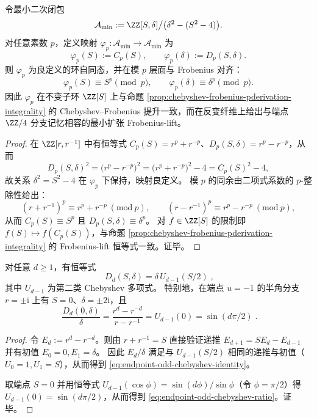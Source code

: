 \begin{proposition}\label{prop:endpoint-antiinv-frobenius-lift}
令最小二次闭包
\[
\mathcal{A}_{\min}:=\ZZ[S,\delta]\big/\bigl(\delta^2-(S^2-4)\bigr).
\]
对任意素数 \(p\)，定义映射 \(\varphi_p:\mathcal{A}_{\min}\to\mathcal{A}_{\min}\) 为
\[
\varphi_p(S):=C_p(S),
\qquad
\varphi_p(\delta):=D_p(S,\delta).
\]
则 \(\varphi_p\) 为良定义的环自同态，并在模 \(p\) 层面与 Frobenius 对齐：
\[
\varphi_p(S)\equiv S^p\pmod p,
\qquad
\varphi_p(\delta)\equiv \delta^p\pmod p.
\]
因此 \(\varphi_p\) 在不变子环 \(\ZZ[S]\) 上与命题 \ref{prop:chebyshev-frobenius-pderivation-integrality} 的 Chebyshev--Frobenius 提升一致，而在反变纤维上给出与端点 \(\ZZ/4\) 分支记忆相容的最小扩张 Frobenius-lift。
\end{proposition}
\begin{proof}
在 \(\ZZ[r,r^{-1}]\) 中有恒等式 \(C_p(S)=r^p+r^{-p}\)、\(D_p(S,\delta)=r^p-r^{-p}\)，从而
\[
D_p(S,\delta)^2
=\bigl(r^p-r^{-p}\bigr)^2
=\bigl(r^p+r^{-p}\bigr)^2-4
=C_p(S)^2-4,
\]
故关系 \(\delta^2=S^2-4\) 在 \(\varphi_p\) 下保持，映射良定义。
模 \(p\) 的同余由二项式系数的 \(p\)-整除性给出：
\[
(r+r^{-1})^p\equiv r^p+r^{-p}\ (\mathrm{mod}\ p),
\qquad
(r-r^{-1})^p\equiv r^p-r^{-p}\ (\mathrm{mod}\ p),
\]
从而 \(C_p(S)\equiv S^p\) 且 \(D_p(S,\delta)\equiv \delta^p\)。
对 \(f\in\ZZ[S]\) 的限制即 \(f(S)\mapsto f(C_p(S))\)，与命题 \ref{prop:chebyshev-frobenius-pderivation-integrality} 的 Frobenius-lift 恒等式一致。证毕。
\end{proof}

\begin{proposition}\label{prop:endpoint-odd-chebyshev-identity}
对任意 \(d\ge 1\)，有恒等式
\begin{equation}\label{eq:endpoint-odd-chebyshev-identity}
\boxed{\;
D_d(S,\delta)=\delta\,U_{d-1}(S/2)\; },
\end{equation}
其中 \(U_{d-1}\) 为第二类 Chebyshev 多项式。
特别地，在端点 \(u=-1\) 的半角分支 \(r=\pm\mathrm{i}\) 上有 \(S=0\)、\(\delta=\pm 2\mathrm{i}\)，且
\begin{equation}\label{eq:endpoint-odd-chebyshev-ratio}
\boxed{\;
\frac{D_d(0,\delta)}{\delta}
=\frac{r^{d}-r^{-d}}{r-r^{-1}}
=U_{d-1}(0)
=\sin(d\pi/2)\; }.
\end{equation}
\end{proposition}
\begin{proof}
令 \(E_d:=r^{d}-r^{-d}\)。则由 \(r+r^{-1}=S\) 直接验证递推
\(
E_{d+1}=SE_d-E_{d-1}
\)
并有初值 \(E_0=0,E_1=\delta\)。
因此 \(E_d/\delta\) 满足与 \(U_{d-1}(S/2)\) 相同的递推与初值（\(U_0=1,U_1=S\)），从而得到 \eqref{eq:endpoint-odd-chebyshev-identity}。
\par
取端点 \(S=0\) 并用恒等式 \(U_{d-1}(\cos\phi)=\sin(d\phi)/\sin\phi\)（令 \(\phi=\pi/2\)）得 \(U_{d-1}(0)=\sin(d\pi/2)\)，从而得到 \eqref{eq:endpoint-odd-chebyshev-ratio}。证毕。
\end{proof}

